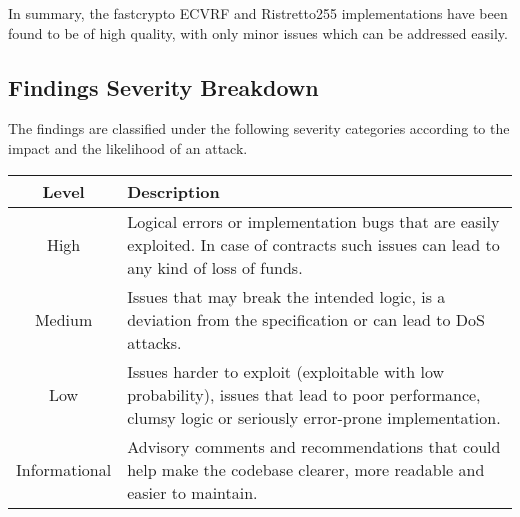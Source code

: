 In summary, the fastcrypto ECVRF and Ristretto255 implementations have been found to be of high quality, with only minor issues which can be addressed easily.

\subsection{Findings Severity Breakdown}
The findings are classified under the following severity categories according to the impact and the likelihood of an attack.
\begin{center}
\begin{tabular}{|| c | p{9cm}||} 
 \hline
 Level & Description \\ [0.5ex] 
 \hline\hline
 High & Logical errors or implementation bugs that are easily exploited. In case of contracts such issues can lead to any kind of loss of funds.\\
 \hline
 Medium & Issues that may break the intended logic, is a deviation from the specification or can lead to DoS attacks.\\
 \hline
 Low & Issues harder to exploit (exploitable with low probability), issues that lead to poor performance, clumsy logic or seriously error-prone implementation.\\
 \hline
 Informational & Advisory comments and recommendations that could help make the codebase clearer, more readable and easier to maintain.\\
 \hline
\end{tabular}
\end{center}


